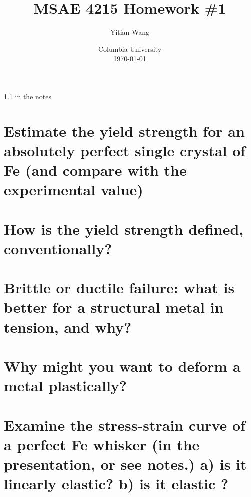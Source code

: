 \documentclass{article}
\title{MSAE 4215 Homework \#1}
\author{Yitian Wang}
\date{Columbia University \\ \today}
\begin{document}
1.1 in the notes

\section{Estimate the yield strength for an absolutely perfect single crystal of Fe 
(and compare with the experimental value)}

\section{How is the yield strength defined, conventionally?}

\section{Brittle or ductile failure: what is better for a structural metal in tension, and why?}

\section{Why might you want to deform a metal plastically?}

\section{Examine the stress-strain curve of a perfect Fe whisker (in the presentation, or see notes.)  
a) is it linearly elastic?  b) is it elastic ?}
\end{document}
